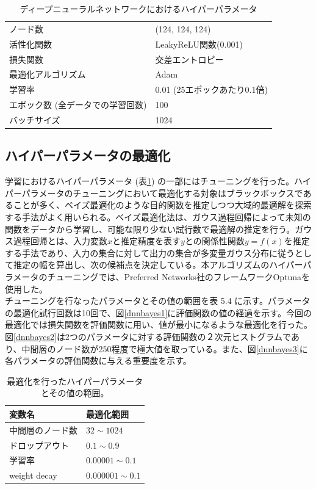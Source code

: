 \begin{table}[H]
 \centering
  \begin{tabular}{ l  l }
   \hline
   ノード数 & (124, 124, 124)\\
   活性化関数 & LeakyReLU関数(0.001)\\
   損失関数 & 交差エントロピー\\
   最適化アルゴリズム & Adam\\
   学習率 & 0.01 (25エポックあたり0.1倍)\\
   エポック数 (全データでの学習回数) & 100\\
   バッチサイズ & 1024\\
   \hline
  \end{tabular}
  \caption{ディープニューラルネットワークにおけるハイパーパラメータ}
  \label{dnnsetting}
\end{table}
\subsection{ハイパーパラメータの最適化}
学習におけるハイパーパラメータ (表\ref{dnnsetting}) の一部にはチューニングを行った。ハイパーパラメータのチューニングにおいて最適化する対象はブラックボックスであることが多く、ベイズ最適化\cite{bayesian}のような目的関数を推定しつつ大域的最適解を探索する手法がよく用いられる。ベイズ最適化法は、ガウス過程回帰によって未知の関数をデータから学習し、可能な限り少ない試行数で最適解の推定を行う。ガウス過程回帰とは、入力変数$x$と推定精度を表す$y$との関係性関数$y = f(x)$を推定する手法であり、入力の集合に対して出力の集合が多変量ガウス分布に従うとして推定の幅を算出し、次の候補点を決定している。本アルゴリズムのハイパーパラメータのチューニングでは、Preferred Networks社のフレームワークOptuna\cite{optuna}を使用した。\\
チューニングを行なったパラメータとその値の範囲を表 5.4%
に示す。パラメータの最適化試行回数は10回で、図\ref{dnnbayes1}に評価関数の値の経過を示す。今回の最適化では損失関数を評価関数に用い、値が最小になるような最適化を行った。図\ref{dnnbayes2}は2つのパラメータに対する評価関数の２次元ヒストグラムであり、中間層のノード数が250程度で極大値を取っている。また、図\ref{dnnbayes3}に各パラメータの評価関数に与える重要度を示す。

\begin{table}[H]
\centering
 \begin{tabular}{ l  l }
 \hline
 変数名 & 最適化範囲\\
 \hline
 \hline
 中間層のノード数 & $32 \sim 1024$\\
 ドロップアウト & $0.1 \sim 0.9$\\
 学習率 & $0.00001 \sim 0.1$\\
 weight decay & $0.000001 \sim 0.1$\\
  \hline
 \end{tabular}
 \label{dnnoptuna}
 \caption{最適化を行ったハイパーパラメータとその値の範囲。}
\end{table}

